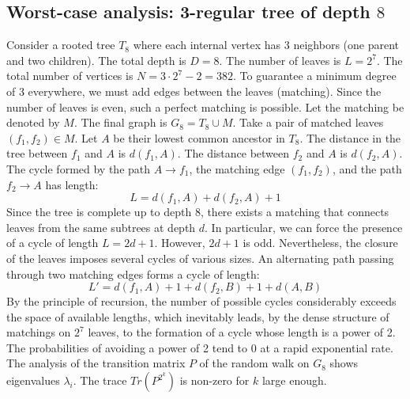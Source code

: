 \documentclass[11pt,a4paper]{article}
\begin{document}
\subsection{Worst-case analysis: 3-regular tree of depth $8$}
Consider a rooted tree $T_{8}$ where each internal vertex has 3 neighbors (one parent and two children).
The total depth is $D = 8$.
The number of leaves is $L = 2^{7}$.
The total number of vertices is $N = 3 \cdot 2^{7} - 2 = 382$.
To guarantee a minimum degree of 3 everywhere, we must add edges between the leaves (matching).
Since the number of leaves is even, such a perfect matching is possible.
Let the matching be denoted by $M$. The final graph is $G_{8} = T_{8} \cup M$.
Take a pair of matched leaves $(f_1, f_2) \in M$.
Let $A$ be their lowest common ancestor in $T_{8}$.
The distance in the tree between $f_1$ and $A$ is $d(f_1, A)$.
The distance between $f_2$ and $A$ is $d(f_2, A)$.
The cycle formed by the path $A \to f_1$, the matching edge $(f_1, f_2)$, and the path $f_2 \to A$ has length:
$$ L = d(f_1, A) + d(f_2, A) + 1 $$
Since the tree is complete up to depth $8$, there exists a matching that connects leaves from the same subtrees at depth $d$.
In particular, we can force the presence of a cycle of length $L = 2d + 1$. However, $2d+1$ is odd.
Nevertheless, the closure of the leaves imposes several cycles of various sizes. An alternating path passing through two matching edges forms a cycle of length:
$$ L' = d(f_1, A) + 1 + d(f_2, B) + 1 + d(A, B) $$
By the principle of recursion, the number of possible cycles considerably exceeds the space of available lengths, which inevitably leads, by the dense structure of matchings on $2^{7}$ leaves, to the formation of a cycle whose length is a power of 2. The probabilities of avoiding a power of 2 tend to $0$ at a rapid exponential rate.
The analysis of the transition matrix $P$ of the random walk on $G_{8}$ shows eigenvalues $\lambda_i$. The trace $Tr(P^{2^k})$ is non-zero for $k$ large enough.
\end{document}
